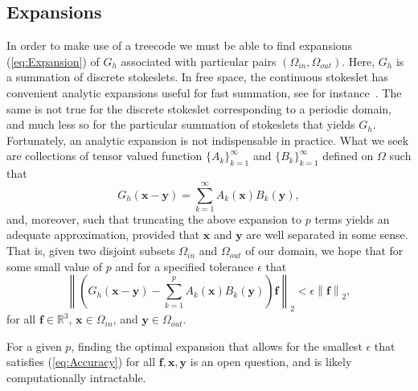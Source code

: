 \documentclass[preprint,12pt]{elsarticle}
\newcommand{\norm}[1]{\left\lVert#1\right\rVert}
\newcommand{\Inf}{\infty}
\newcommand{\B}[1]{\mathbf{#1}}
\newcommand{\BB}[1]{\mathbb{#1}}
\begin{document}
\subsection{Expansions}
\label{Sec:Treecode_Expansions}
In order to make use of a treecode we must be able to find expansions (\ref{eq:Expansion}) of $G_h$ associated with particular pairs $\left(\Omega_{in},\Omega_{out}\right)$. Here, 
$G_h$ is a summation of discrete stokeslets. In free space, the continuous stokeslet has convenient analytic expansions useful for fast summation, see for instance~\cite{Stokes_FMM}. The same is not true for the discrete stokeslet corresponding to a periodic domain, and much less so for the particular summation of stokeslets that yields $G_h$. Fortunately, an analytic expansion is not indispensable in practice. What we seek are collections of tensor valued function $\{A_k\}_{k=1}^\Inf$ and $\{B_k\}_{k=1}^\Inf$ defined on $\Omega$ such that 
\begin{equation}
G_h(\B{x} - \B{y}) = \sum_{k = 1}^\infty A_k(\B{x}) B_k(\B{y}),
\end{equation}
and, moreover, such that truncating the above expansion to $p$ terms yields an adequate approximation, provided that $\B{x}$ and $\B{y}$ are well separated in some sense. That is, given two disjoint subsets $\Omega_{in}$ and $\Omega_{out}$ of our domain, we hope that for some small value of $p$ and for a specified tolerance $\epsilon$ that
\begin{equation}
\norm{
\left(G_h(\B{x} - \B{y}) - \sum_{k = 1}^p A_k(\B{x}) B_k(\B{y})\right)
\B{f}
}_2 < \epsilon \norm{\B{f}}_2,
\label{eq:Accuracy}
\end{equation}
for all $\B{f}\in\BB{R}^3$, $\B{x}\in\Omega_{in}$, and $\B{y}\in\Omega_{out}$.

For a given $p$, finding the optimal expansion that allows for the smallest $\epsilon$ that satisfies (\ref{eq:Accuracy}) for all $\B{f},\B{x},\B{y}$ is an open question, and is likely computationally intractable.
\end{document}
